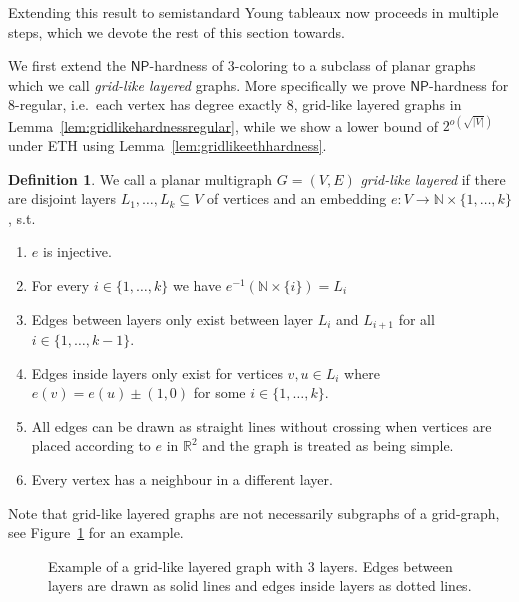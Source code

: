 \documentclass[10pt,a4paper]{article}
\numberwithin{equation}{section}
\theoremstyle{definition}
\newtheorem{definition}[equation]{Definition}
\newcommand{\IN}{\mathbb{N}}
\newcommand{\IR}{\mathbb{R}}
\newcommand{\NP}{\ensuremath{\mathsf{NP}}}
\begin{document}
Extending this result to semistandard Young tableaux now proceeds in multiple steps, which we devote the rest of this section towards.

We first extend the $\NP$-hardness of $3$-coloring to a subclass of planar graphs which we call \emph{grid-like layered} graphs.
More specifically we prove $\NP$-hardness for $8$-regular, i.e.\ each vertex has degree exactly $8$, grid-like layered graphs in Lemma~\ref{lem:gridlikehardnessregular}, while we show a lower bound of $2^{o\left(\sqrt{|V|}\right)}$ under ETH using Lemma~\ref{lem:gridlikeethhardness}.
\enlargethispage{2ex}
\begin{definition}
    \label{def:gridlike}
    We call a planar multigraph $G = (V, E)$ \emph{grid-like layered} if there are disjoint layers $L_1, \ldots, L_k \subseteq V$ of vertices and an embedding $e: V \to \IN \times \{1,\ldots,k\}$, s.t.
    \begin{enumerate}
        \item $e$ is injective.
        \item For every $i \in \{1, \ldots, k\}$ we have $e^{-1}(\IN \times \{i\}) = L_i$
        \item Edges between layers only exist between layer $L_i$ and $L_{i+1}$ for all $i \in \{1, \ldots, k-1\}$.
        \item Edges inside layers only exist for vertices $v, u \in L_i$ where $e(v) = e(u) \pm (1,0)$ for some $i \in \{1, \ldots, k\}$.\label{itm:gridlikeeasylayer}
        \item All edges can be drawn as straight lines without crossing when vertices are placed according to $e$ in $\IR^2$ and the graph is treated as being simple.\label{itm:gridlikestraightplanar}
        \item Every vertex has a neighbour in a different layer.\label{itm:gridlikeneighbours}
    \end{enumerate}
\end{definition}
Note that grid-like layered graphs are not necessarily subgraphs of a grid-graph, see Figure~\ref{fig:gridlikeexample} for an example.
\begin{figure}[tpb]
    \centering
    \caption{Example of a grid-like layered graph with $3$ layers. Edges between layers are drawn as solid lines and edges inside layers as dotted lines.}
    \label{fig:gridlikeexample}
\end{figure}
\end{document}
